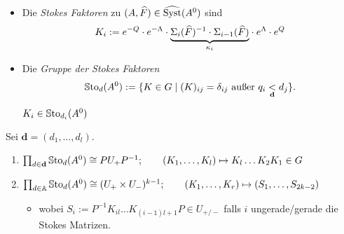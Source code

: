 \begin{defn}
  \begin{itemize}
    \item Die \emph{Stokes Faktoren} zu $(A,\widehat F)\in\widehat{\operatorname{Syst}}(A^0)$ sind
      \[
        K_i:= e^{-Q}\cdot e^{-\Lambda} \cdot \underset{\kappa_i}{\underbrace{%
          \Sigma_i(\hat F)^{-1}\cdot \Sigma_{i-1}(\hat F)}}
        \cdot  e^{\Lambda}\cdot e^{Q}
      \]
    \item Die \emph{Gruppe der Stokes Faktoren}
      \[
        \operatorname{\mathbb{S}to}_d(A^0) := \{K \in G \mid (K)_{ij}
          =\delta_{ij} \text{ außer } q_i\underset{\textbf{d}}{<}d_j \}.
      \]
      \begin{lem}
        $K_i\in\operatorname{\mathbb{S}to}_{d_i}(A^0)$
      \end{lem}
  \end{itemize}
\end{defn}
\begin{lem}[3.2]
  Sei $\textbf{d}=(d_1,\dots,d_l)$.
  \begin{enumerate}
    \item $\prod_{d\in\textbf{d}}\operatorname{\mathbb{S}to}_d(A^0)\cong PU_+P^{-1};
      \qquad
      (K_1,\dots,K_l)\mapsto K_l\dots K_2K_1\in G$
    \item $\prod_{d\in\mathbb{A}}\operatorname{\mathbb{S}to}_d(A^0)\cong (U_+\times U_-)^{k-1};
      \qquad
      (K_1,\dots,K_r)\mapsto (S_1,\dots,S_{2k-2})$
      \begin{itemize}
        \item wobei $S_i:=P^{-1}K_{il}\dots K_{(i-1)l+1}P\in U_{+/-}$ falls $i$
          ungerade/gerade die Stokes Matrizen.
      \end{itemize}
  \end{enumerate}
\end{lem}

\TODO[$\cH(A^0)\cong\prod_{d\in\A}\SSto_d(A^0)$]
